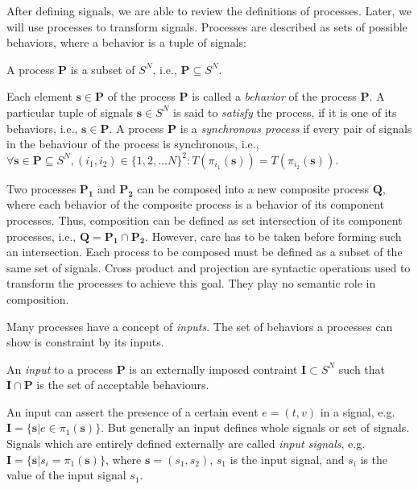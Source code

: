 After defining signals, we are able to review the definitions of processes.
Later, we will use processes to transform signals.
Processes are described as sets of possible behaviors, where
a behavior is a tuple of signals:
\begin{sdefinition}
A process $\mathbf{P}$ is a subset of $S^N$, i.e., $\mathbf{P} \subseteq S^N$.
\end{sdefinition}
Each element $\mathbf{s} \in \mathbf{P}$ of the process $\mathbf{P}$ is
called a \emph{behavior} of the process $\mathbf{P}$. A particular tuple
of signals $\mathbf{s} \in S^N$ is said to \emph{satisfy} the process,
if it is one of its behaviors, i.e., $\mathbf{s} \in \mathbf{P}$.
A process $\mathbf{P}$ is a \emph{synchronous process} if
every pair of signals in the behaviour of the process is synchronous, i.e.,
$\forall{\mathbf{s} \in \mathbf{P} \subseteq S^N, (i_1,i_2) \in \{1,2,\ldots N\}^2}:
T(\pi{}_{i_1}(\mathbf{s})) = T(\pi{}_{i_2}(\mathbf{s}))$.

Two processes $\mathbf{P_1}$ and $\mathbf{P_2}$ can be composed into
a new composite process $\mathbf{Q}$, where
each behavior of the composite process is a behavior of its
component processes. Thus, composition can be defined as set intersection of
its component processes, i.e., $\mathbf{Q} = \mathbf{P_1} \cap \mathbf{P_2}$.
However, care has to be taken before forming such an intersection.
Each process to be composed must be defined as a subset of the same
set of signals. Cross product and projection are syntactic operations
used to transform the processes to achieve this goal. They play no
semantic role in composition.


Many processes have a concept of \emph{inputs}. The set of behaviors
a processes can show is constraint by its inputs.
\begin{sdefinition}
An \emph{input} to a process $\mathbf{P}$ is an externally
imposed contraint $\mathbf{I} \subset S^N$ such that
$\mathbf{I} \cap \mathbf{P}$ is the set of acceptable behaviours.
\end{sdefinition}
An input can assert the presence of a certain event $e = (t,v)$ in a signal,
e.g. $\mathbf{I} = \{\mathbf{s} | e \in \pi{}_{1}(\mathbf{s}) \}$.
But generally an input defines whole signals or set of signals.
Signals which are entirely defined externally are called \emph{input signals},
e.g. $\mathbf{I} = \{\mathbf{s} | s_i = \pi{}_{1}(\mathbf{s}) \}$, where
$\mathbf{s} = (s_1, s_2)$, $s_1$ is the input signal, and
$s_i$ is the value of the input signal $s_1$.

